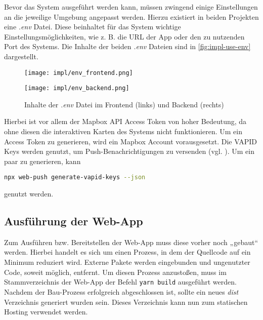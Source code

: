 Bevor das System ausgeführt werden kann, müssen zwingend einige Einstellungen an
die jeweilige Umgebung angepasst werden. Hierzu existiert in beiden Projekten
eine \textit{.env} Datei. Diese beinhaltet für das System wichtige
Einstellungsmöglichkeiten, wie z. B. die URL der App oder den zu nutzenden Port
des Systems. Die Inhalte der beiden \textit{.env} Dateien sind in
\autoref{fig:impl-use-env} dargestellt.

\begin{figure}[htpb]
    \centering
    \begin{minipage}{.55\textwidth}
        \centering
        \texttt{[image: impl/env\_frontend.png]}
    \end{minipage}%
    \begin{minipage}{.45\textwidth}
        \centering
        \texttt{[image: impl/env\_backend.png]}
    \end{minipage}
    \caption{Inhalte der \textit{.env} Datei im Frontend (links) und Backend (rechts)}
    \label{fig:impl-use-env}
\end{figure}

Hierbei ist vor allem der Mapbox API Access Token von hoher Bedeutung, da ohne
diesen die interaktiven Karten des Systems nicht funktionieren. Um ein Access
Token zu generieren, wird ein Mapbox Account vorausgesetzt. Die VAPID Keys
werden genutzt, um Push-Benachrichtigungen zu versenden (vgl.
). Um ein paar zu generieren, kann

\lstinline[style=code, language=bash, style=inline]{npx web-push generate-vapid-keys --json}

genutzt werden.

\subsection{Ausführung der Web-App}


Zum Ausführen bzw. Bereitstellen der Web-App muss diese vorher noch „gebaut“
werden. Hierbei handelt es sich um einen Prozess, in dem der Quellcode auf ein
Minimum reduziert wird. Externe Pakete werden eingebunden und ungenutzter Code,
soweit möglich, entfernt. Um diesen Prozess anzustoßen, muss im
Stammverzeichnis der Web-App der Befehl \lstinline[style=code, language=bash, style=inline]{yarn build} ausgeführt werden. Nachdem der Bau-Prozess erfolgreich
abgeschlossen ist, sollte ein neues \textit{dist} Verzeichnis generiert wurden
sein. Dieses Verzeichnis kann nun zum statischen Hosting verwendet werden.

